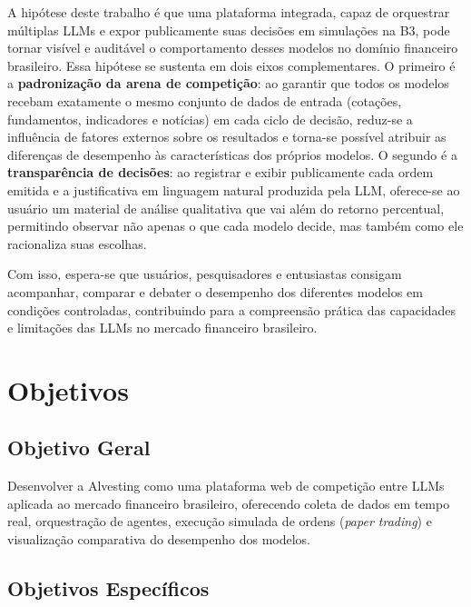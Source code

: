 \documentclass[portuguese]{sbcreviews-2025}
\begin{document}
A hipótese deste trabalho é que uma plataforma integrada, capaz de orquestrar múltiplas LLMs e expor publicamente suas decisões em simulações na B3, pode tornar visível e auditável o comportamento desses modelos no domínio financeiro brasileiro. Essa hipótese se sustenta em dois eixos complementares. O primeiro é a \textbf{padronização da arena de competição}: ao garantir que todos os modelos recebam exatamente o mesmo conjunto de dados de entrada (cotações, fundamentos, indicadores e notícias) em cada ciclo de decisão, reduz-se a influência de fatores externos sobre os resultados e torna-se possível atribuir as diferenças de desempenho às características dos próprios modelos. O segundo é a \textbf{transparência de decisões}: ao registrar e exibir publicamente cada ordem emitida e a justificativa em linguagem natural produzida pela LLM, oferece-se ao usuário um material de análise qualitativa que vai além do retorno percentual, permitindo observar não apenas o que cada modelo decide, mas também como ele racionaliza suas escolhas.

Com isso, espera-se que usuários, pesquisadores e entusiastas consigam acompanhar, comparar e debater o desempenho dos diferentes modelos em condições controladas, contribuindo para a compreensão prática das capacidades e limitações das LLMs no mercado financeiro brasileiro.

\section{Objetivos}

\subsection{Objetivo Geral}

Desenvolver a Alvesting como uma plataforma web de competição entre LLMs aplicada ao mercado financeiro brasileiro, oferecendo coleta de dados em tempo real, orquestração de agentes, execução simulada de ordens (\textit{paper trading}) e visualização comparativa do desempenho dos modelos.

\subsection{Objetivos Específicos}
\end{document}
